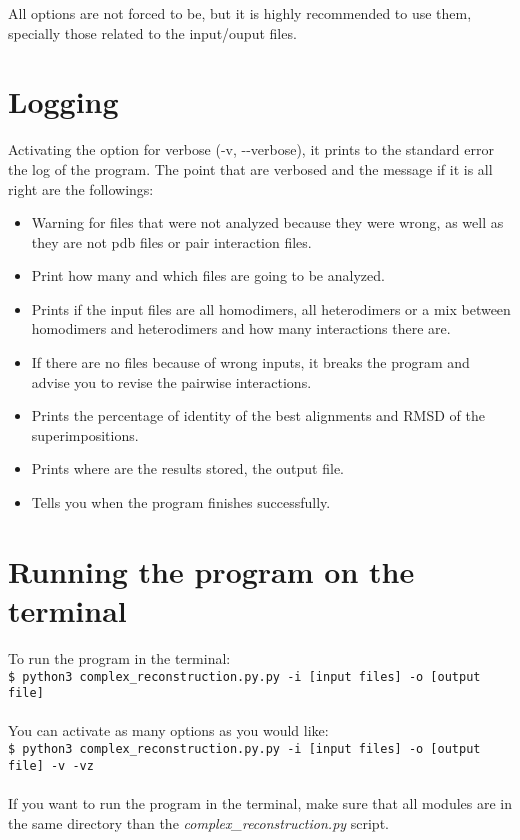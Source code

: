 \documentclass[a4paper,10pt]{report}
\begin{document}
All options are not forced to be, but it is highly recommended to use them, specially those related to the input/ouput files.

\section{Logging}

Activating the option for verbose (-v, -{}-verbose), it prints to the standard error the log of the program. The point that are verbosed and the message if it is all right are the followings:

\begin{itemize}
 \item Warning for files that were not analyzed because they were wrong, as well as they are not pdb files or pair interaction files.
 \item Print how many and which files are going to be analyzed.
 \item Prints if the input files are all homodimers, all heterodimers or a mix between homodimers and heterodimers and how many interactions there are.
 \item If there are no files because of wrong inputs, it breaks the program and advise you to revise the pairwise interactions.
 \item Prints the percentage of identity of the best alignments and RMSD of the superimpositions.
 \item Prints where are the results stored, the output file.
 \item Tells you when the program finishes successfully.
\end{itemize}

\section{Running the program on the terminal}

To run the program in the terminal:\\ \texttt{\$ python3 complex\_reconstruction.py.py -i [input files] -o [output file]} \\\\ You can activate as many options as you would like:\\ \texttt{\$ python3 complex\_reconstruction.py.py -i [input files] -o [output file] -v -vz}\\\\
If you want to run the program in the terminal, make sure that all modules are in the same directory than the \textit{complex\_reconstruction.py} script.
\end{document}
